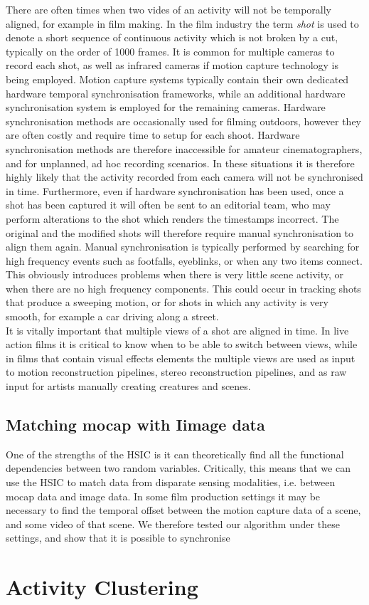 There are often times when two vides of an activity will not be temporally aligned, for example in film making. In the film industry the term \textit{shot} is used to denote a short sequence of continuous activity which is not broken by a cut, typically on the order of 1000 frames. It is common for multiple cameras to record each shot, as well as infrared cameras if motion capture technology is being employed. Motion capture systems typically contain their own dedicated hardware temporal synchronisation frameworks, while an additional hardware synchronisation system is employed for the remaining cameras. Hardware synchronisation methods are occasionally used for filming outdoors, however they are often costly and require time to setup for each shoot. Hardware synchronisation methods are therefore inaccessible for amateur cinematographers, and for unplanned, ad hoc recording scenarios. In these situations it is therefore highly likely that the activity recorded from each camera will not be synchronised in time. Furthermore, even if hardware synchronisation has been used, once a shot has been captured it will often be sent to an editorial team, who may perform alterations to the shot which renders the timestamps incorrect. The original and the modified shots will therefore require manual synchronisation to align them again. Manual synchronisation is typically performed by searching for high frequency events such as footfalls, eyeblinks, or when any two items connect. This obviously introduces problems when there is very little scene activity, or when there are no high frequency components. This could occur in tracking shots that produce a sweeping motion, or for shots in which any activity is very smooth, for example a car driving along a street. \\

It is vitally important that multiple views of a shot are aligned in time. In live action films it is critical to know when to be able to switch between views, while in films that contain visual effects elements the multiple views are used as input to motion reconstruction pipelines, stereo reconstruction pipelines, and as raw input for artists manually creating creatures and scenes. \\

\subsection{Matching mocap with Iimage data}

One of the strengths of the HSIC is it can theoretically find all the functional dependencies between two random variables. Critically, this means that we can use the HSIC to match data from disparate sensing modalities, i.e. between mocap data and image data. In some film production settings it may be necessary to find the temporal offset between the motion capture data of a scene, and some video of that scene. We therefore tested our algorithm under these settings, and show that it is possible to synchronise 

\section{Activity Clustering}

\subsection{}

